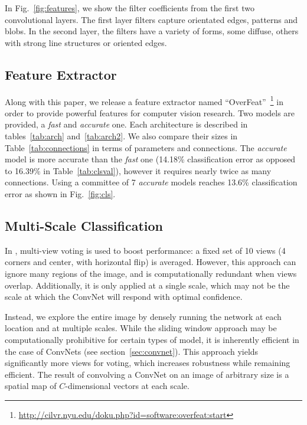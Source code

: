 \documentclass{article} %
\newcommand{\fig}[1]{Fig.~\ref{fig:#1}}
\newcommand{\tab}[1]{Table~\ref{tab:#1}}
\begin{document}
In \fig{features}, we show the filter coefficients from the first two
convolutional layers. The first layer filters capture orientated
edges, patterns and blobs. In the second layer, the filters have a
variety of forms, some diffuse, others with strong line structures or
oriented edges.

\subsection{Feature Extractor}

Along with this paper, we release a feature extractor
named ``OverFeat''~\footnote{\url{http://cilvr.nyu.edu/doku.php?id=software:overfeat:start}}
in order to provide powerful features for computer vision research.
Two models are provided, a {\em fast} and {\em accurate} one. Each architecture is
described in tables~\ref{tab:arch} and~\ref{tab:arch2}. We also compare
their sizes in \tab{connections} in terms of parameters and connections.
The {\em accurate} model is more accurate than the {\em fast} one (14.18\% classification error
as opposed to 16.39\% in \tab{clsval}), however it requires nearly twice as many connections.
Using a committee of 7 {\em accurate} models reaches 13.6\% classification error as shown in \fig{cls}.

\subsection{Multi-Scale Classification}
\label{sec:ms_class}

In \cite{Kriz12}, multi-view voting is used to boost performance:
a fixed set of 10 views (4 corners and center, with horizontal flip)
is averaged. However, this approach can ignore many regions of the image,
and is computationally redundant when views overlap.
Additionally, it is only applied at a single scale, which may not be the scale
at which the ConvNet will respond with optimal confidence.

Instead, we explore the entire image by densely running the network
at each location and at multiple scales.
While the sliding window approach may be computationally prohibitive for certain
types of model, it is inherently efficient in the case of ConvNets
(see section~\ref{sec:convnet}). This approach yields significantly more views for voting,
which increases robustness while remaining efficient.
The result of convolving a ConvNet on an image of arbitrary size is a spatial map
of $C$-dimensional vectors at each scale.
\end{document}
